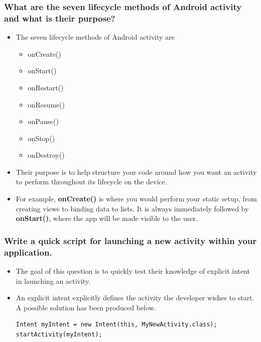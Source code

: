 \documentclass[9pt, b5paper]{article}
\begin{document}
\subsubsection{What are the seven lifecycle methods of Android activity and what is their purpose?}
\label{sec-1-2-4}
\begin{itemize}
\item The seven lifecycle methods of Android activity are 
\begin{itemize}
\item onCreate()
\item onStart()
\item onRestart()
\item onResume()
\item onPause()
\item onStop()
\item onDestroy()
\end{itemize}
\item Their purpose is to help structure your code around how you want an activity to perform throughout its lifecycle on the device.
\item For example, \textbf{onCreate()} is where you would perform your static setup, from creating views to binding data to lists. It is always immediately followed by \textbf{onStart()}, where the app will be made visible to the user.
\end{itemize}
\subsubsection{Write a quick script for launching a new activity within your application.}
\label{sec-1-2-5}
\begin{itemize}
\item The goal of this question is to quickly test their knowledge of explicit intent in launching an activity.
\item An explicit intent explicitly defines the activity the developer wishes to start. A possible solution has been produced below.
\begin{verbatim}
Intent myIntent = new Intent(this, MyNewActivity.class);
startActivity(myIntent);
\end{verbatim}
\end{itemize}
\end{document}
